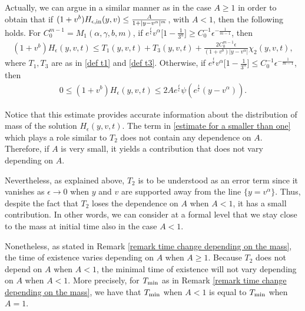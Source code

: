\documentclass[11pt]{article}
\numberwithin{equation}{section}
\begin{document}
Actually, we can argue in a similar manner as in the case $A\geq 1$ in order to obtain that if $(1+v^{b}) H_{\epsilon,\textup{in}}(y,v)\leq \frac{A}{1+|y-v^{\alpha}|^{m}}$, with $A<1$, then the following holds. For $C_{0}^{m-1} =M_{1}(\alpha,\gamma,b,m)$, if $e^{\frac{t}{\epsilon}}v^{\alpha}\big[1-\frac{1}{3^{\alpha}}\big]\geq  C_{0}^{-1}\epsilon^{-\frac{1}{m-1}} $, then
    \begin{align}\label{estimate for a smaller than one}
 (1+v^{b}) H_{\epsilon}(y,v,t)\leq  T_{1}(y,v,t)+T_{3}(y,v,t)+\frac{2C_{0}^{m-1} \epsilon}{(1+v^{b})|y-v^{\alpha}|} \chi_{2}(y,v,t),
    \end{align}
where $T_{1}, T_{3}$ are as in \eqref{def t1} and \eqref{def t3}. Otherwise, if  $e^{\frac{t}{\epsilon}}v^{\alpha}\big[1-\frac{1}{3^{\alpha}}\big]\leq  C_{0}^{-1}\epsilon^{-\frac{1}{m-1}} $, then
\begin{align}
   0\leq (1+v^{b}) H_{\epsilon}(y,v,t)\leq 2Ae^{\frac{t}{\epsilon}}\psi(e^{\frac{t}{\epsilon}}(y-v^{\alpha})).
    \end{align}


Notice that this estimate provides accurate information about the distribution of mass of the solution $H_{\epsilon}(y,v,t)$. The term in \eqref{estimate for a smaller than one} which plays a role similar to $T_{2}$ does not contain any dependence on $A$. Therefore, if $A$ is very small, it yields a contribution that does not vary depending on $A$. 

Nevertheless, as explained above,  $T_{2}$ is to be understood as an error term since it vanishes as $\epsilon\rightarrow 0$ when $y$ and $v$ are supported away from the line $\{y=v^{\alpha}\}$. Thus, despite the fact that $T_{2}$ loses the dependence on $A$ when $A<1$, it has a small contribution. In other words, we can consider at a formal level that we stay close to the mass at initial time also in the case $A<1$.

Nonetheless, as stated in Remark \ref{remark time change depending on the mass}, the time of existence varies depending on $A$ when $A\geq 1$.  Because $T_{2}$ does not depend on $A$ when $A<1$, the minimal time of existence will not vary depending on $A$ when $A<1$. More precisely, for $T_{\textup{min}}$ as in Remark \ref{remark time change depending on the mass}, we have that $T_{\textup{min}}$ when $A<1$ is equal to $T_{\textup{min}}$ when $A=1$.


\vspace{0.2cm}
\end{document}
